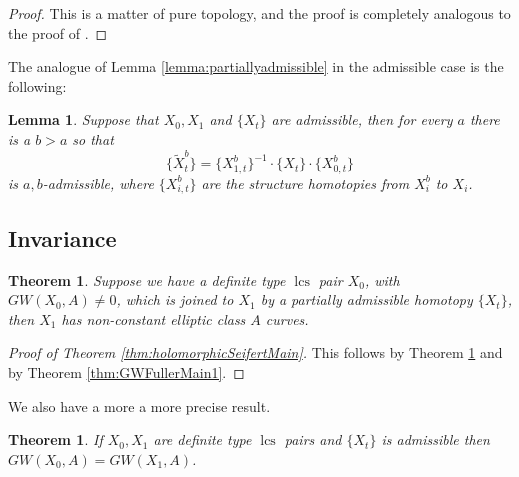 \documentclass{amsart}
\numberwithin{equation}{section}
\newtheorem{theorem}[equation]{Theorem}
\newtheorem{lemma}[equation]{Lemma}
\theoremstyle{definition}
\theoremstyle{remark}
\DeclareMathOperator{\lcs}{lcs}
\begin{document}
\begin{proof}
This is a matter of pure topology, and the proof is completely analogous to the proof of \cite [Lemma 3.8]{citeSavelyevFuller}. 
\end{proof}
The analogue of Lemma \ref{lemma:partiallyadmissible} in the admissible case is the following:
\begin{lemma} Suppose that $X _{0}, X _{1}  $ and $\{X _{t} \}$ are admissible,
then for every $a$ there is a $b>a$ so that 
\begin{equation} \label{eq:tilda2}
\{\widetilde{X}  ^{b}_t   \} = \{ {X} ^{b}
_{1,t}   \} ^{-1} \cdot \{X _{t}
 \} \cdot \{X ^{b} _ {0,t}
 \} 
\end{equation} 
   is $a,b$-admissible,  where  $\{X  ^{b} _ {i,t}  \}$ are the structure homotopies from 
 $X _{i}   ^{b}  $ to $X _{i} $.
\end{lemma}

\subsection {Invariance}
\begin{theorem} \label{thm:welldefined} 
Suppose we have a definite type $\lcs$ pair $X _{0}  $, with $GW (X
_{0}, A) \neq 0$,  which is joined to $X _{1} $  by a partially admissible 
homotopy $\{X _{t} \}$, 
then  $X _{1} $ has non-constant elliptic class $A$ curves. 
\end{theorem}
\begin{proof} [Proof of Theorem \ref{thm:holomorphicSeifertMain}]
This follows by Theorem \ref{thm:welldefined}  
and by Theorem \ref{thm:GWFullerMain1}.
\end{proof}  
We also have a more a more precise result. 
\begin{theorem} \label{thm:welldefinedadmissible} If $X
_{0}, X _{1}  $ are  definite type $\lcs$ pairs and $\{X _{t} \}$ is admissible then $GW (X_0, A) = GW (X _{1},
A)$.
\end{theorem}
\end{document}
